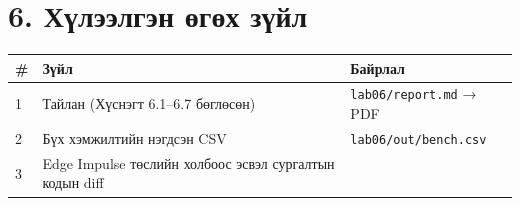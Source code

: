 \hypertarget{ux445ux4afux43bux44dux44dux43bux433ux44dux43d-ux4e9ux433ux4e9ux445-ux437ux4afux439ux43b}{%
\section{6. Хүлээлгэн өгөх зүйл}\label{ux445ux4afux43bux44dux44dux43bux433ux44dux43d-ux4e9ux433ux4e9ux445-ux437ux4afux439ux43b}}

\begingroup\scriptsize\begin{longtable}[]{@{}lll@{}}
\toprule
\begin{minipage}[b]{0.30\columnwidth}\raggedright
\#\strut
\end{minipage} & \begin{minipage}[b]{0.30\columnwidth}\raggedright
Зүйл\strut
\end{minipage} & \begin{minipage}[b]{0.30\columnwidth}\raggedright
Байрлал\strut
\end{minipage}\tabularnewline
\midrule
\endhead
\begin{minipage}[t]{0.30\columnwidth}\raggedright
1\strut
\end{minipage} & \begin{minipage}[t]{0.30\columnwidth}\raggedright
Тайлан (Хүснэгт 6.1--6.7 бөглөсөн)\strut
\end{minipage} & \begin{minipage}[t]{0.30\columnwidth}\raggedright
\texttt{lab06/report.md} → PDF\strut
\end{minipage}\tabularnewline
\begin{minipage}[t]{0.30\columnwidth}\raggedright
2\strut
\end{minipage} & \begin{minipage}[t]{0.30\columnwidth}\raggedright
Бүх хэмжилтийн нэгдсэн CSV\strut
\end{minipage} & \begin{minipage}[t]{0.30\columnwidth}\raggedright
\texttt{lab06/\allowbreak{}out/\allowbreak{}bench.\allowbreak{}csv}\strut
\end{minipage}\tabularnewline
\begin{minipage}[t]{0.30\columnwidth}\raggedright
3\strut
\end{minipage} & \begin{minipage}[t]{0.30\columnwidth}\raggedright
Edge Impulse төслийн холбоос эсвэл сургалтын кодын diff\strut
\end{minipage} & \begin{minipage}[t]{0.30\columnwidth}\raggedright

\end{minipage}
\end{longtable}
